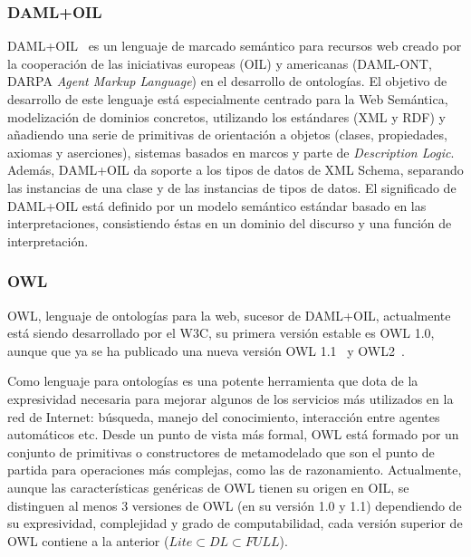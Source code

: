 \subsubsection{DAML+OIL}\label{daml+oil}
\gls{DAML+OIL}~\cite{HM00} es un lenguaje de marcado semántico para recursos web creado por la cooperación de las iniciativas
europeas (OIL) y americanas (DAML-ONT, \gls{DARPA} \textit{Agent Markup Language})
en el desarrollo de ontologías. El objetivo de desarrollo de este lenguaje está
especialmente centrado para la Web Semántica, modelización de dominios concretos,
utilizando los estándares (\gls{XML} y \gls{RDF}) y añadiendo una serie de primitivas de
orientación a objetos (clases, propiedades, axiomas y aserciones),
sistemas basados en marcos y parte de \textit{Description Logic}. Además, 
DAML+OIL da soporte a los tipos de datos de \gls{XML Schema}, separando las instancias
de una clase y de las instancias de tipos de datos. El significado de DAML+OIL
está definido por un modelo semántico estándar basado en las interpretaciones, consistiendo éstas 
en un dominio del discurso y una función de interpretación.

\subsubsection{OWL}\label{owl}
\gls{OWL}, lenguaje de ontologías para la web, sucesor de DAML+OIL, actualmente está
siendo desarrollado por el W3C, su primera versión estable es OWL 1.0, 
aunque que ya se ha publicado una nueva versión OWL 1.1~\cite{OWL11} y OWL2~\cite{owl2-primer}.

Como lenguaje para ontologías es una potente herramienta que dota de la
expresividad necesaria para mejorar algunos de los servicios más utilizados en
la red de Internet: búsqueda, manejo del conocimiento, interacción entre agentes
automáticos etc. Desde un punto de vista más formal, OWL está formado por
un conjunto de primitivas o constructores de metamodelado que son el punto de
partida para operaciones más complejas, como las de razonamiento. Actualmente,
aunque las características genéricas de OWL tienen su origen en OIL, se distinguen
al menos 3 versiones de OWL (en su versión 1.0 y 1.1) dependiendo de su expresividad, complejidad y grado
de computabilidad, cada versión superior de OWL contiene a la anterior
($Lite\subset DL \subset FULL$).

